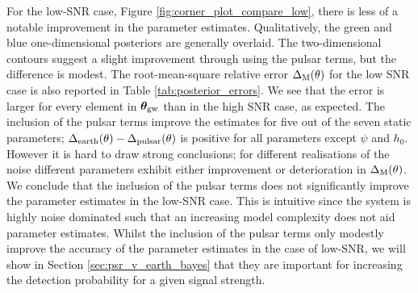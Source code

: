 \documentclass[fleqn,usenatbib,useAMS]{mnras}
\begin{document}
For the low-SNR case,  Figure \ref{fig:corner_plot_compare_low}, there is less of a notable improvement in the parameter estimates. Qualitatively, the green and blue one-dimensional posteriors are generally overlaid. The two-dimensional contours suggest a slight improvement through using the pulsar terms, but the difference is modest. The root-mean-square relative error $\Delta_{\rm M}(\theta)$ for the low SNR case is also reported in Table \ref{tab:posterior_errors}. We see that the error is larger for every element in $\boldsymbol{\theta}_{\rm gw}$ than in the high SNR case, as expected. The inclusion of the pulsar terms improve the estimates for five out of the seven static parameters; $\Delta_{\rm earth}(\theta)-\Delta_{\rm pulsar}(\theta)$ is positive for all parameters except $\psi$ and $h_0$. However it is hard to draw strong conclusions; for different realisations of the noise different parameters exhibit either improvement or deterioration in $\Delta_{\rm M}(\theta)$. We conclude that the inclusion of the pulsar terms does not significantly improve the parameter estimates in the low-SNR case. This is intuitive since the system is highly noise dominated such that an increasing model complexity does not aid parameter estimates. Whilst the inclusion of the pulsar terms only modestly improve the accuracy of the parameter estimates in the case of low-SNR, we will show in Section \ref{sec:psr_v_earth_bayes} that they are important for increasing the detection probability for a given signal strength. \newline 
		
\end{document}
